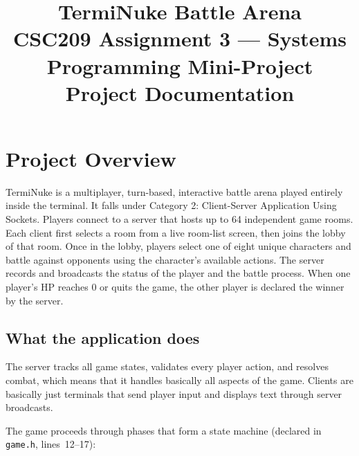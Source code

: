 \documentclass[11pt,letterpaper]{article}
\title{\textbf{TermiNuke Battle Arena}\\[4pt]
       \large CSC209 Assignment 3 --- Systems Programming Mini-Project\\[2pt]
       \normalsize Project Documentation}
\date{}
\begin{document}
\maketitle
\thispagestyle{empty}
\tableofcontents
\newpage

\section{Project Overview}

TermiNuke is a multiplayer, turn-based, interactive battle arena played entirely inside the terminal. It falls under Category 2: Client-Server Application Using Sockets. Players connect to a server that hosts up to 64 independent game rooms. Each client first selects a room from a live room-list screen, then joins the lobby of that room. Once in the lobby, players select one of eight unique characters and battle against opponents using the character's available actions. The server records and broadcasts the status of the player and the battle process. When one player's HP reaches 0 or quits the game, the other player is declared the winner by the server.

\subsection*{What the application does}

The server tracks all game states, validates every player action, and resolves combat, which means that it handles basically all aspects of the game. Clients are basically just terminals that send player input and displays text through server broadcasts.

The game proceeds through phases that form a state machine (declared in \texttt{game.h}, lines~12--17):
\end{document}
